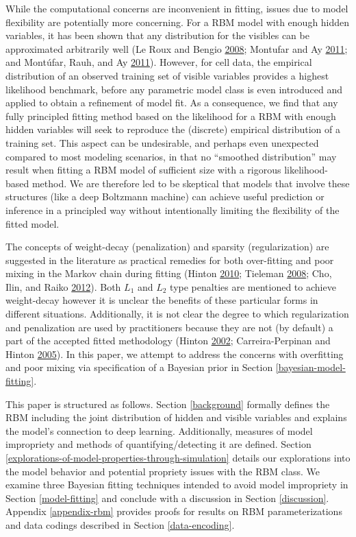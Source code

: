 \documentclass[12pt]{article}
\theoremstyle{definition}
\begin{document}
While the computational concerns are inconvenient in fitting, issues due
to model flexibility are potentially more concerning. For a RBM model
with enough hidden variables, it has been shown that any distribution
for the visibles can be approximated arbitrarily well (Le Roux and
Bengio \protect\hyperlink{ref-le2008representational}{2008}; Montufar
and Ay \protect\hyperlink{ref-montufar2011refinements}{2011}; and
Montúfar, Rauh, and Ay
\protect\hyperlink{ref-montufar2011expressive}{2011}). However, for cell
data, the empirical distribution of an observed training set of visible
variables provides a highest likelihood benchmark, before any parametric
model class is even introduced and applied to obtain a refinement of
model fit. As a consequence, we find that any fully principled fitting
method based on the likelihood for a RBM with enough hidden variables
will seek to reproduce the (discrete) empirical distribution of a
training set. This aspect can be undesirable, and perhaps even
unexpected compared to most modeling scenarios, in that no ``smoothed
distribution'' may result when fitting a RBM model of sufficient size
with a rigorous likelihood-based method. We are therefore led to be
skeptical that models that involve these structures (like a deep
Boltzmann machine) can achieve useful prediction or inference in a
principled way without intentionally limiting the flexibility of the
fitted model.

The concepts of weight-decay (penalization) and sparsity
(regularization) are suggested in the literature as practical remedies
for both over-fitting and poor mixing in the Markov chain during fitting
(Hinton \protect\hyperlink{ref-hinton2010practical}{2010}; Tieleman
\protect\hyperlink{ref-tieleman2008training}{2008}; Cho, Ilin, and Raiko
\protect\hyperlink{ref-cho2012tikhonov}{2012}). Both \(L_1\) and \(L_2\)
type penalties are mentioned to achieve weight-decay however it is
unclear the benefits of these particular forms in different situations.
Additionally, it is not clear the degree to which regularization and
penalization are used by practitioners because they are not (by default)
a part of the accepted fitted methodology (Hinton
\protect\hyperlink{ref-hinton2002training}{2002}; Carreira-Perpinan and
Hinton \protect\hyperlink{ref-carreira2005contrastive}{2005}). In this
paper, we attempt to address the concerns with overfitting and poor
mixing via specification of a Bayesian prior in Section
\ref{bayesian-model-fitting}.

This paper is structured as follows. Section \ref{background} formally
defines the RBM including the joint distribution of hidden and visible
variables and explains the model's connection to deep learning.
Additionally, measures of model impropriety and methods of
quantifying/detecting it are defined. Section
\ref{explorations-of-model-properties-through-simulation} details our
explorations into the model behavior and potential propriety issues with
the RBM class. We examine three Bayesian fitting techniques intended to
avoid model impropriety in Section \ref{model-fitting} and conclude with
a discussion in Section \ref{discussion}. Appendix \ref{appendix-rbm}
provides proofs for results on RBM parameterizations and data codings
described in Section \ref{data-encoding}.
\end{document}

